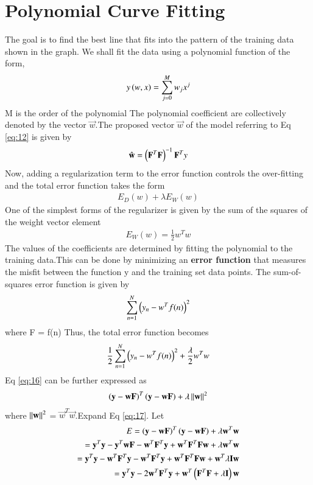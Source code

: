 \documentclass[journal,12pt,twocolumn]{IEEEtran}
\begin{document}
\section{Polynomial Curve Fitting}
The goal is to find the best line that fits into the  pattern of the training data shown in the graph.
We shall fit the data using a polynomial function of the form, 
\begin{align}
     y\left(w,x\right)= \sum_{j=0}^{M} w_j x^{j}\\
\end{align}
M is the order of the polynomial
The polynomial coefficient are collectively denoted by the vector $\vec{w}$.The proposed vector $\vec{w}$ of the model referring to Eq \eqref{eq:12} is given by 
\begin{align}
    \hat{\mathbf{w}} = \left(\mathbf{F}^T\mathbf{F}\right)^{-1}\mathbf{F}^Ty \label{eq:13}
\end{align}
Now, adding a regularization term to the error function controls the over-fitting and the total error function takes the form
\begin{align}
    E_{D}(w) + \lambda E_{W}(w)
\end{align}
One of the simplest forms of the regularizer is given by the sum of the squares of the weight vector element
\begin{align}
    E_{W}(w) = \frac{1}{2} w^T w
\end{align}
The values of the coefficients are determined by fitting the polynomial to the
training data.This can be done by minimizing an \textbf{error function} that measures the
misfit between the function y and the training set data points. The sum-of-squares error function is given by
\begin{align}
    \sum_{n=1}^{N}\left(y_{n} - w^T f(n)\right)^2 \label{eq:15}
\end{align}
where F = f(n)
Thus, the total error function becomes
\begin{align}
    \frac{1}{2}\sum_{n=1}^{N}\left(y_{n} - w^T f(n)\right)^2 + \frac{\lambda}{2}w^T w\label{eq:16}
\end{align}
Eq \eqref{eq:16} can be further expressed as
\begin{align}
    \left(\mathbf{y} - \mathbf{wF}\right)^T\left(\mathbf{y} - \mathbf{wF}\right) + \lambda\left\lVert\mathbf{w}\right\rVert^2\label{eq:17}
\end{align}
where $\left\lVert\mathbf{w}\right\rVert^2$ = $\vec{w}^T\vec{w}$.Expand Eq \eqref{eq:17}.
Let 
\begin{align}
    E = \left(\mathbf{y} - \mathbf{wF}\right)^T\left(\mathbf{y} - \mathbf{wF}\right) + \lambda\mathbf{w}^T\mathbf{w}\\
      = \mathbf{y}^T\mathbf{y} - \mathbf{y}^T\mathbf{wF} - \mathbf{w}^T\mathbf{F}^T\mathbf{y} + \mathbf{w}^T\mathbf{F}^T\mathbf{F}\mathbf{w} + \lambda\mathbf{w}^T\mathbf{w}\\
      = \mathbf{y}^T\mathbf{y} -\mathbf{w}^T\mathbf{F}^T\mathbf{y}  - \mathbf{w}^T\mathbf{F}^T\mathbf{y} + \mathbf{w}^T\mathbf{F}^T\mathbf{F}\mathbf{w} + \mathbf{w}^T\lambda\mathbf{I}\mathbf{w}\\
      = \mathbf{y}^T\mathbf{y} -2\mathbf{w}^T\mathbf{F}^T\mathbf{y}+\mathbf{w}^T\left(\mathbf{F}^T\mathbf{F} + \lambda\mathbf{I}\right)\mathbf{w}\label{eq:18}
\end{align}
\end{document}
